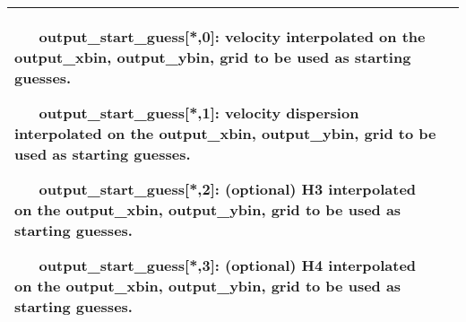 \begin{center}
\begin{longtable}{p{2.7cm}| p{11.1cm}}
      \medskip

   \  \  \                output\_start\_guess[*,0]: velocity interpolated on the  output\_xbin, output\_ybin, grid to be used as starting guesses.

   \  \  \           output\_start\_guess[*,1]: velocity dispersion interpolated on the  output\_xbin, output\_ybin, grid to be used as starting guesses.

   \  \  \            output\_start\_guess[*,2]: (optional) H3 interpolated on the  output\_xbin, output\_ybin, grid to be used as starting guesses.

   \  \  \            output\_start\_guess[*,3]: (optional) H4 interpolated on the  output\_xbin, output\_ybin, grid to be used as starting guesses.\\

\hline
\end{longtable}
\end{center}
